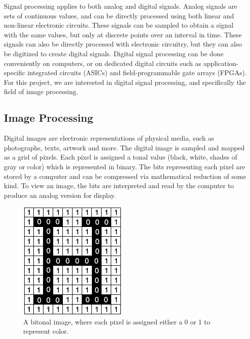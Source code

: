 \documentclass[]{article}
\begin{document}
\noindent Signal processing applies to both analog and digital signals.  Analog signals are sets of continuous values, and can be directly processed using both linear and non-linear electronic circuits.  These signals can be sampled to obtain a signal with the same values, but only at discrete points over an interval in time.  These signals can also be directly processed with electronic circuitry, but they can also be digitized to create digital signals.  Digital signal processing can be done conveniently on computers, or on dedicated digital circuits such as application-specific integrated circuits (ASICs) and field-programmable gate arrays (FPGAs).  For this project, we are interested in digital signal processing, and specifically the field of image processing. \\

		\subsection{Image Processing}

Digital images are electronic representations of physical media, such as photographs, texts, artwork and more.  The digital image is sampled and mapped as a grid of pixels.  Each pixel is assigned a tonal value (black, white, shades of gray or color) which is represented in binary.  The bits representing each pixel are stored by a computer and can be compressed via mathematical reduction of some kind.  To view an image, the bits are interpreted and read by the computer to produce an analog version for display. \\ 

\begin{figure}[h]
      			\centering
      			\includegraphics[scale=0.75]{./images/research_image_processing_1}
			\caption{A bitonal image, where each pixel is assigned either a 0 or 1 to represent color.}
			\label{fig:research_image_processing_1}
   		 \end{figure}
\end{document}
